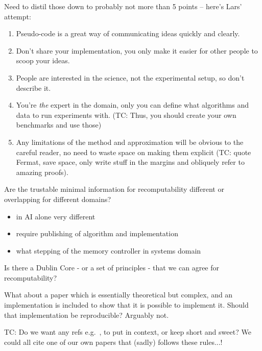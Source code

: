 \documentclass[a4paper,11pt]{article}
\begin{document}
Need to distil those down to probably not more than 5 points -- here's Lars'
attempt:
\begin{enumerate}
\item Pseudo-code is a great way of communicating ideas quickly and clearly.
\item Don't share your implementation, you only make it easier for other people
to scoop your ideas.
\item People are interested in the science, not the experimental setup, so don't
describe it.
\item You're \emph{the} expert in the domain, only you can define what
algorithms and data to run experiments with. (TC: Thus, you should
create your own benchmarks and use those)
\item Any limitations of the method and approximation will be obvious to the
careful reader, no need to waste space on making them explicit (TC:
quote Fermat, save space, only write stuff in the margins and obliquely
refer to amazing proofs).
\end{enumerate}


Are the trustable minimal information for recomputability  different or overlapping for different domains?
\begin{itemize}
\item in AI alone very different
\item require publishing of algorithm and implementation
\item what stepping of the memory controller in systems domain
\end{itemize}

Is there a Dublin Core - or a set of principles - that we can agree
for recomputability?

What about a paper which is essentially theoretical but complex, and
an implementation is included to show that it is possible to implement
it. Should that implementation be reproducible? Arguably not.

TC: Do we want any refs
e.g.~\cite{crick-et-al_wssspe2,crick-et-al_recomp2014}, to put in
context, or keep short and sweet? We could all cite one of our own
papers that (sadly) follows these rules...!



\end{document}
